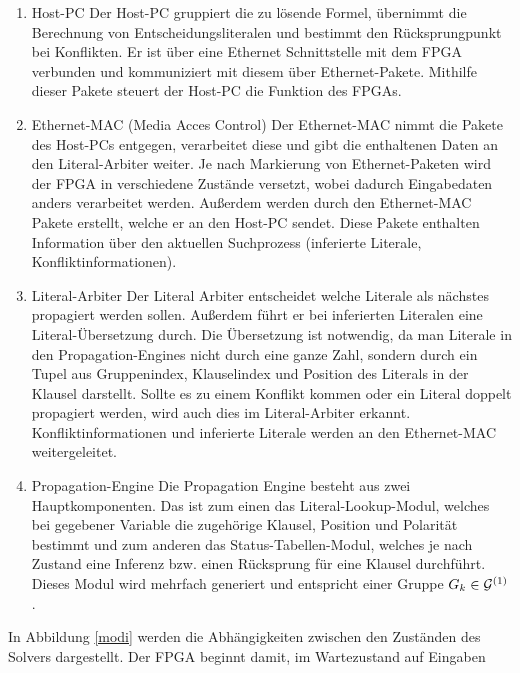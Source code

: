 \begin{enumerate}
\item Host-PC \newline
  Der Host-PC gruppiert die zu lösende Formel, übernimmt die Berechnung 
  von Entscheidungsliteralen und bestimmt den Rücksprungpunkt bei Konflikten.
  Er ist über eine Ethernet Schnittstelle 
  mit dem FPGA verbunden und kommuniziert mit diesem über Ethernet-Pakete.
  Mithilfe dieser Pakete steuert der Host-PC die Funktion des FPGAs.
\item Ethernet-MAC (Media Acces Control) \cite{xilinxether:2011}\newline
  Der Ethernet-MAC nimmt die Pakete des Host-PCs entgegen, verarbeitet 
  diese und gibt die enthaltenen Daten an den Literal-Arbiter weiter.
  Je nach Markierung von Ethernet-Paketen wird der FPGA in verschiedene Zustände versetzt, 
  wobei dadurch Eingabedaten anders verarbeitet werden.
  Außerdem werden durch den Ethernet-MAC Pakete erstellt,
  welche er an den Host-PC
  sendet. Diese Pakete enthalten Information über den
  aktuellen Suchprozess (inferierte Literale, Konfliktinformationen).
\item Literal-Arbiter \newline
  Der Literal Arbiter entscheidet welche Literale als nächstes propagiert 
  werden sollen. Außerdem führt er bei inferierten Literalen eine 
  Literal-Übersetzung durch. Die Übersetzung ist notwendig, da man Literale
  in den Propagation-Engines nicht durch eine ganze Zahl, sondern
  durch ein Tupel aus Gruppenindex, Klauselindex und
  Position des Literals in der Klausel darstellt.
  Sollte es zu einem Konflikt kommen oder ein Literal
  doppelt propagiert werden,  
  wird auch dies im Literal-Arbiter erkannt. Konfliktinformationen
  und inferierte Literale werden an den Ethernet-MAC weitergeleitet.
\item Propagation-Engine \newline
  Die Propagation Engine besteht aus zwei Hauptkomponenten. 
  Das ist zum einen das Literal-Lookup-Modul, welches bei gegebener 
  Variable die zugehörige Klausel, Position und Polarität 
  bestimmt und zum anderen das Status-Tabellen-Modul, welches 
  je nach Zustand eine Inferenz bzw. einen Rücksprung für eine Klausel durchführt.
  Dieses Modul wird mehrfach generiert und entspricht einer 
  Gruppe $G_k \in {\cal G}^{(1)}$.
\end{enumerate}
In Abbildung \ref{modi} werden die Abhängigkeiten zwischen
den Zuständen des Solvers dargestellt.
Der FPGA beginnt damit, im Wartezustand auf Eingaben
